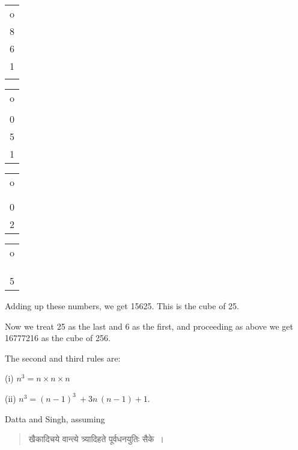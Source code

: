 \documentclass[10pt, openany]{book}
\begin{document}
{{{{{{{{{{{{{{{{{{{{\begin{sloppypar}
{\begin{center} \begin{tabular}{c} o\\8\\6\\1\\ \\ \end{tabular}
\begin{tabular}{c} o\\ \\0\\5\\1  \end{tabular}
\begin{tabular}{c} o\\ \\ \\0 \\2  \end{tabular}
\begin{tabular}{c} o\\ \\ \\ \\5  \end{tabular}
  \end{center}}


\end{sloppypar}


\newpage

\begin{sloppypar}

{\small Adding up these numbers, we get 15625. This is the cube of 25.
\vspace{3mm}

 Now we treat 25 as the last and 6 as the first, and proceeding as
above we get 16777216 as the cube of 256.
\vspace{3mm}

 The second and third rules are:
\vspace{2mm}

\hspace{20mm} {(i) ${n^3} = n \times n \times n$

\hspace{19mm} (ii) ${n^3} = (n-1)^3~+ 3n\,(n-1) + 1.$}
\vspace{3mm}

Datta and Singh, assuming

\begin{quote}
{\s खैकादिचये वान्त्ये त्र्यादिहते पूर्वधनयुतिः सैके~।}
\end{quote}

}
\end{sloppypar}}}}}}}}}}}}}}}}}}}}}
\end{document}
